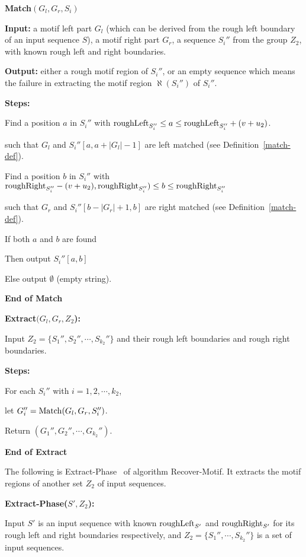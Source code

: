 \documentclass[11pt]{article}
\newcommand{\match}{{\rm Match}}
\newcommand{\algmnam}{Recover-Motif}
\newcommand{\roughright}{{\rm roughRight}}
\newcommand{\phasetwo}{Extract-Phase}
\begin{document}
{\bf Match$(G_l,G_r, S_i)$}

{\bf Input:} a motif left part $G_l$  (which can be derived from the
rough left boundary of an input sequence $S$), a motif right part
$G_r$, a sequence $S_i''$ from the group $Z_2$, with known rough
left and right boundaries.

{\bf Output:} either a rough motif region of $S_i''$, or an empty
sequence which means the failure in extracting the motif region
$\aleph(S_i'')$ of $S_i''$.


{\bf Steps:}

\qquad Find a position $a$ in $S_i''$ with ${\rm roughLeft}_{S_i''}\le
a\le {\rm roughLeft}_{S_i''}+(v+u_2)$.


\qquad such that $G_l$ and $S_i''[a,a+|G_l|-1]$ are left matched
(see Definition~\ref{match-def}).


\qquad Find a position $b$ in $S_i''$ with
$\roughright_{S_i''}-(v+u_2),
\roughright_{S_i''})\le b\le \roughright_{S_i''}$

\qquad such that $G_r$ and $S_i''[b-|G_r|+1,b]$ are right matched
(see Definition~\ref{match-def}).


\qquad If both $a$ and $b$ are found

\qquad Then output $S_i''[a,b]$


\qquad Else output $\emptyset$ (empty string).


{\bf End of Match}



\vskip 10pt



{\bf Extract$(G_l, G_r, Z_2$):}

Input $Z_2=\{S_1'',S_2'',\cdots, S_{k_2}''\}$ and their rough left
boundaries and rough right boundaries.


{\bf Steps:}

\qquad For each $S_i''$ with $i=1,2,\cdots, k_2$,

\qquad\qquad let $G_i''=\match(G_l, G_r, S_i'')$.

\qquad  Return $(G_1'', G_2'',\cdots, G_{k_2}'')$.

{\bf End of Extract}

\vskip 10pt



The following is \phasetwo~ of algorithm \algmnam. It  extracts the
motif regions of another set $Z_2$ of input sequences.

{\bf \phasetwo($S', Z_2$):}

Input $S'$ is an input sequence with known ${\rm roughLeft}_{S'}$ and
$\roughright_{S'}$ for its rough left and right boundaries
respectively, and $Z_2=\{S_1'',\cdots, S_{k_2}''\}$ is a set of
input sequences.
\end{document}
